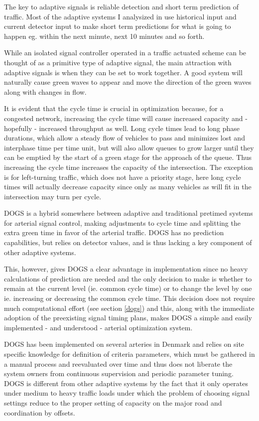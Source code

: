 The key to adaptive signals is reliable detection and short term prediction of traffic. Most of the adaptive systems I analysized in \cite{forprojekt} use historical input and current detector input to make short term predictions for what is going to happen eg. within the next minute, next 10 minutes and so forth.

While an isolated signal controller operated in a traffic actuated scheme can be thought of as a primitive type of adaptive signal, the main attraction with adaptive signals is when they can be set to work together. A good system will naturally cause green waves to appear and move the direction of the green waves along with changes in flow.

It is evident that the cycle time is crucial in optimization because, for a congested network, increasing the cycle time will cause increased capacity and - hopefully - increased throughput as well. Long cycle times lead to long phase durations, which allow a steady flow of vehicles to pass and minimizes lost and interphase time per time unit, but will also allow queues to grow larger until they can be emptied by the start of a green stage for the approach of the queue. Thus increasing the cycle time increases the capacity of the intersection. The exception is for left-turning traffic, which does not have a priority stage, here long cycle times will actually decrease capacity since only as many vehicles as will fit in the intersection may turn per cycle.

DOGS is a hybrid somewhere between adaptive and traditional pretimed systems for arterial signal control, making adjustments to cycle time and splitting the extra green time in favor of the arterial traffic. DOGS has no prediction capabilities, but relies on detector values, and is thus lacking a key component of other adaptive systems. 

This, however, gives DOGS a clear advantage in implementation since no heavy calculations of prediction are needed and the only decision to make is whether to remain at the current level (ie. common cycle time) or to change the level by one ie. increasing or decreasing the common cycle time. This decision does not require much computational effort (see section \ref{dogs}) and this, along with the immediate adoption of the preexisting signal timing plans, makes DOGS a simple and easily implemented - and understood - arterial optimization system.

DOGS has been implemented on several arteries in Denmark and relies on site specific knowledge for definition of criteria parameters, which must be gathered in a manual process and reevaluated over time and thus does not liberate the system owners from continuous supervision and periodic parameter tuning.
DOGS is different from other adaptive systems by the fact that it only operates under medium to heavy traffic loads under which the problem of choosing signal settings reduce to the proper setting of capacity on the major road and coordination by offsets.